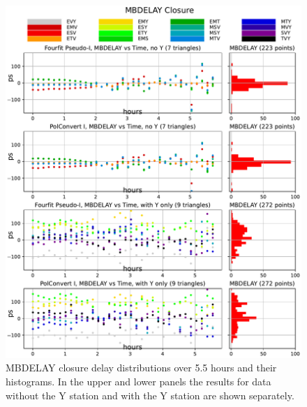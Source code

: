 \documentclass[letterpaper,twoside,12pt]{article}
\begin{document}
\begin{figure}[h!]
  \centering
  \includegraphics[width=40pc]{MBDELAY_Closure_Delay_Y_no_Y.pdf}
  \caption{\small MBDELAY closure delay distributions over 5.5 hours and their histograms. In the upper and lower panels the results for data without the Y station and with the Y station are shown separately.}
  \label{mbdYnY}
\end{figure}
\end{document}
